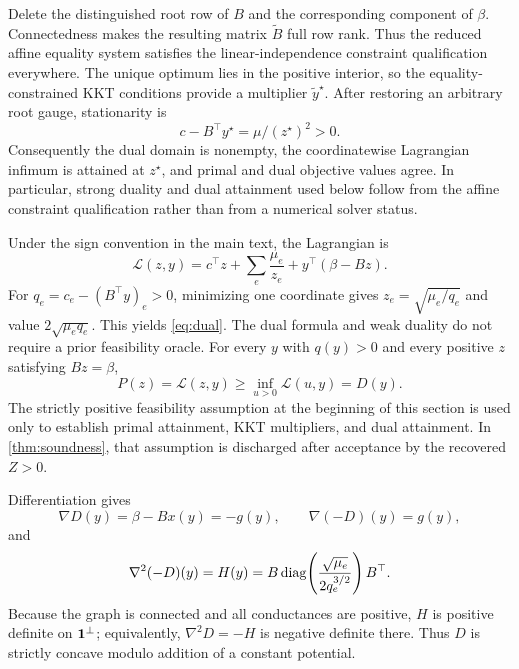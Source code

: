 Delete the distinguished root row of $B$ and the corresponding component of
$\beta$.  Connectedness makes the resulting matrix $\widetilde B$ full row
rank.  Thus the reduced affine equality system satisfies the linear-independence
constraint qualification everywhere.  The unique optimum lies in the positive
interior, so the equality-constrained KKT conditions provide a multiplier
$\widetilde y^\star$.  After restoring an arbitrary root gauge, stationarity is
\begin{equation}
 c-B^\top y^\star=\mu/(z^\star)^2>0.
 \label{eq:kkt-positive-slack}
\end{equation}
Consequently the dual domain is nonempty, the coordinatewise Lagrangian
infimum is attained at $z^\star$, and primal and dual objective values agree.
In particular, strong duality and dual attainment used below follow from the
affine constraint qualification rather than from a numerical solver status.

Under the sign convention in the main text, the Lagrangian is
\begin{equation}
 \mathcal L(z,y)=c^\top z+\sum_e\frac{\mu_e}{z_e}
 +y^\top(\beta-Bz).
\end{equation}
For $q_e=c_e-(B^\top y)_e>0$, minimizing one coordinate gives
$z_e=\sqrt{\mu_e/q_e}$ and value $2\sqrt{\mu_eq_e}$.  This yields
\cref{eq:dual}.  The dual formula and weak duality do not require a prior
feasibility oracle.  For every $y$ with $q(y)>0$ and every positive $z$
satisfying $Bz=\beta$,
\[
 P(z)=\mathcal L(z,y)\ge\inf_{u>0}\mathcal L(u,y)=D(y).
\]
The strictly positive feasibility assumption at the beginning of this section
is used only to establish primal attainment, KKT multipliers, and dual
attainment.  In \cref{thm:soundness}, that assumption is discharged after
acceptance by the recovered $Z>0$.

Differentiation gives
\begin{equation}
 \nabla D(y)=\beta-Bx(y)=-g(y),\qquad \nabla(-D)(y)=g(y),
\end{equation}
and
\begin{equation}
 \nabla^2(-D)(y)=H(y)
 =B\operatorname{diag}\!\left(\frac{\sqrt{\mu_e}}{2q_e^{3/2}}\right)B^\top.
\end{equation}
Because the graph is connected and all conductances are positive, $H$ is
positive definite on $\mathbf{1}^\perp$; equivalently, $\nabla^2D=-H$ is negative
definite there.  Thus $D$ is strictly concave modulo addition of a constant
potential.

